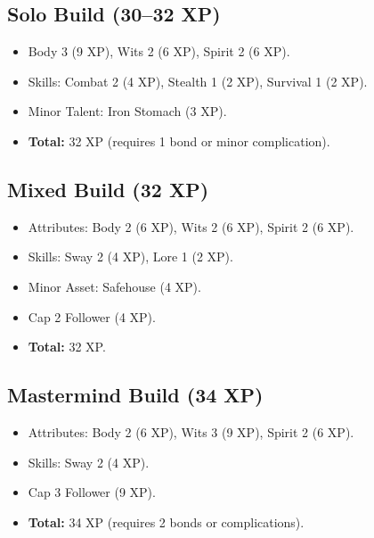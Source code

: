 \subsection{Solo Build (30--32 XP)}
\label{subsec:solo-example}

\begin{itemize}
\item Body 3 (9 XP), Wits 2 (6 XP), Spirit 2 (6 XP).
\item Skills: Combat 2 (4 XP), Stealth 1 (2 XP), Survival 1 (2 XP).
\item Minor Talent: Iron Stomach (3 XP).
\item \textbf{Total:} 32 XP (requires 1 bond or minor complication).
\end{itemize}

\subsection{Mixed Build (32 XP)}
\label{subsec:mixed-example}

\begin{itemize}
\item Attributes: Body 2 (6 XP), Wits 2 (6 XP), Spirit 2 (6 XP).
\item Skills: Sway 2 (4 XP), Lore 1 (2 XP).
\item Minor Asset: Safehouse (4 XP).
\item Cap 2 Follower (4 XP).
\item \textbf{Total:} 32 XP.
\end{itemize}

\subsection{Mastermind Build (34 XP)}
\label{subsec:mastermind-example}

\begin{itemize}
\item Attributes: Body 2 (6 XP), Wits 3 (9 XP), Spirit 2 (6 XP).
\item Skills: Sway 2 (4 XP).
\item Cap 3 Follower (9 XP).
\item \textbf{Total:} 34 XP (requires 2 bonds or complications).
\end{itemize}

